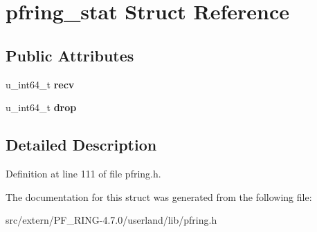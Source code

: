 \hypertarget{structpfring__stat}{
\section{pfring\_\-stat Struct Reference}
\label{structpfring__stat}
}
\subsection*{Public Attributes}
\begin{DoxyCompactItemize}
\item 
\hypertarget{structpfring__stat_a3b79a710501783866c54b359f7f576fa}{
u\_\-int64\_\-t {\bfseries recv}}
\label{structpfring__stat_a3b79a710501783866c54b359f7f576fa}

\item 
\hypertarget{structpfring__stat_ac3e65b7c03821806b63f333d119d1cc2}{
u\_\-int64\_\-t {\bfseries drop}}
\label{structpfring__stat_ac3e65b7c03821806b63f333d119d1cc2}

\end{DoxyCompactItemize}


\subsection{Detailed Description}


Definition at line 111 of file pfring.h.



The documentation for this struct was generated from the following file:\begin{DoxyCompactItemize}
\item 
src/extern/PF\_\-RING-\/4.7.0/userland/lib/pfring.h\end{DoxyCompactItemize}
